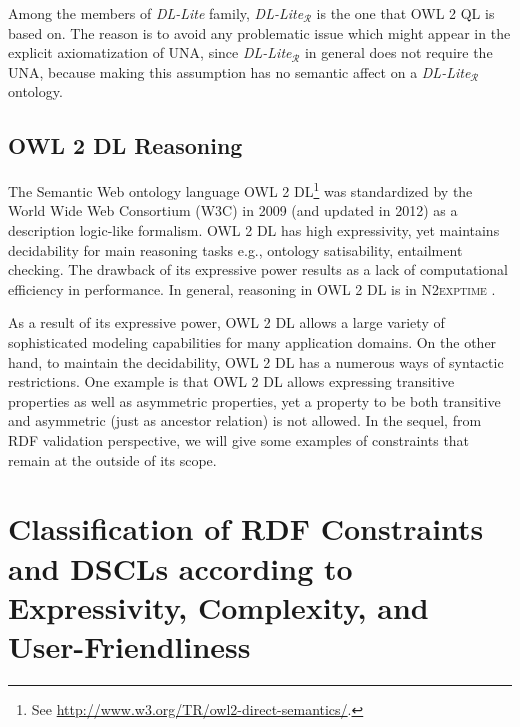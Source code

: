 \documentclass{llncs}
\newcommand{\tb}[1]{\todo[size=\small, color=green!40]{\textbf{Thomas:} #1}}
\begin{document}
Among the members of \textit{DL-Lite} family, \textit{DL-Lite}$_\mathcal{R}$ is the one that OWL 2 QL is based on. The reason is to avoid any problematic issue which might appear in the explicit axiomatization of UNA, since  \textit{DL-Lite}$_\mathcal{R}$ in general does not require the UNA, because making this assumption has no semantic affect on a \textit{DL-Lite}$_\mathcal{R}$ ontology.

\subsection{OWL 2 DL Reasoning}


The Semantic Web ontology language OWL 2 DL\footnote{See \url{http://www.w3.org/TR/owl2-direct-semantics/}.} was standardized by
the World Wide Web Consortium (W3C) in 2009 (and updated in 2012) as a
description logic-like formalism.  OWL 2 DL has high expressivity, yet maintains  decidability for main reasoning tasks e.g., ontology satisability, 
entailment checking. The drawback of its expressive power results as a lack of computational efficiency in performance. In general, reasoning in OWL 2 DL is in \textsc{N2exptime} \cite{owl2profiles2008}. 

As a result of its expressive power, OWL 2 DL allows a large variety of sophisticated modeling capabilities for many application domains.  On the other hand, to maintain the decidability, OWL 2 DL has a numerous ways of syntactic restrictions. One example is that OWL 2 DL allows  expressing transitive properties as well as asymmetric properties, yet a property to be both transitive and asymmetric (just as ancestor relation) is not allowed. In the sequel, from RDF validation perspective, we will give some examples of constraints that remain at the outside of its scope. 

\section{Classification of RDF Constraints and DSCLs according to Expressivity, Complexity, and User-Friendliness}

\end{document}
